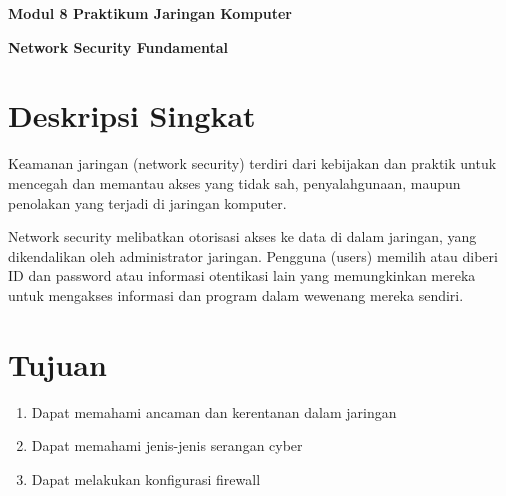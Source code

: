 \documentclass{article}
\begin{document}
    \begin{center}
        \textbf{Modul 8 Praktikum Jaringan Komputer}

        \textbf{Network Security Fundamental}
    \end{center}

    \section*{Deskripsi Singkat}
    Keamanan jaringan (network security) terdiri dari kebijakan dan praktik untuk mencegah dan memantau akses yang tidak sah, penyalahgunaan, maupun penolakan yang terjadi di jaringan komputer.

Network security melibatkan otorisasi akses ke data di dalam jaringan, yang dikendalikan oleh administrator jaringan. Pengguna (users) memilih atau diberi ID dan password atau informasi otentikasi lain yang memungkinkan mereka untuk mengakses informasi dan program dalam wewenang mereka sendiri.

    \section*{Tujuan}
    \begin{enumerate}
        \item Dapat memahami ancaman dan kerentanan dalam jaringan
        \item Dapat memahami jenis-jenis serangan cyber
        \item Dapat melakukan konfigurasi firewall 
    \end{enumerate}
\end{document}
